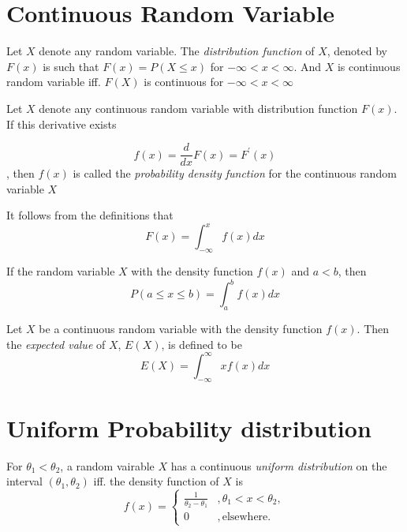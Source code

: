 \section{Continuous Random Variable}
\begin{definition}
    Let $X$ denote any random variable. The \emph{distribution function} of $X$, denoted by $F(x)$
    is such that $F(x) = P(X \leq x)$ for $-\infty < x < \infty$. And $X$ is continuous random variable iff. $F(X)$ is continuous for $-\infty < x < \infty$ 
\end{definition}


\begin{definition}
    Let $X$ denote any continuous random variable with distribution function $F(x)$.
    If this derivative exists

    \[
    f(x) = \frac{d}{dx}F(x) = F^\prime(x)    
    \],
    then $f(x)$ is called the \emph{probability density function} for the continuous random variable $X$
\end{definition}
\begin{corollary*} It follows from the definitions that
    \[F(x) = \int^x_{-\infty} f(x) dx\]
\end{corollary*}
\begin{theorem}
    If the random variable $X$ with the density function $f(x)$ and $a < b$, 
    then
    \[
    P(a\leq x \leq b) = \int_a^b f(x) dx    
    \]
\end{theorem}

\begin{definition}\label{def:exp_val_cont}
    Let $X$ be a continuous random variable with the density function $f(x)$. Then the \emph{expected value} of $X$, $E(X)$, is defined to be
    \[
        E(X) = \int_{-\infty}^{\infty} xf(x) dx
    \]
\end{definition}

\section{Uniform Probability distribution}


\begin{definition}
    For $\theta_1 < \theta_2$, a random vairable $X$ has a continuous \emph{uniform distribution} on the interval $(\theta_1, \theta_2)$ 
    iff. the density function of $X$ is
    \[ 
        f(x) = 
        \begin{cases} 
            \frac{1}{\theta_2 - \theta_1} &, \theta_1 < x <\theta_2, \\
            0 &, \text{elsewhere}.
        \end{cases}
    \]
\end{definition}


